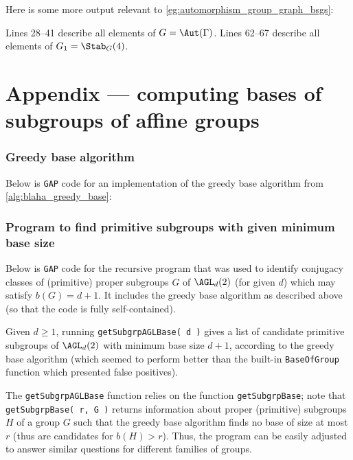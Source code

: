 Here is some more output relevant to \autoref{eg:automorphism_group_graph_bsgs}:\label{app:automorphism_group_graph_bsgs}



Lines 28--41 describe all elements of $G = \Aut(\Gamma)$. Lines 62--67 describe all elements of $G_1 = \Stab_G(4)$.

\chapter{Appendix --- computing bases of subgroups of affine groups}%

\subsection{Greedy base algorithm}

Below is \texttt{GAP} code for an implementation of the greedy base algorithm from \autoref{alg:blaha_greedy_base}:



\subsection{Program to find primitive subgroups with given minimum base size}

Below is \texttt{GAP} code for the recursive program that was used to identify conjugacy classes of (primitive) proper subgroups $G$ of $\AGL_d(2)$ (for given $d$) which may satisfy $b(G) = d + 1$. It includes the greedy base algorithm as described above (so that the code is fully self-contained).

Given $d \geq 1$, running \texttt{getSubgrpAGLBase( d )} gives a list of candidate primitive subgroups of $\AGL_d(2)$ with minimum base size $d + 1$, according to the greedy base algorithm (which seemed to perform better than the built-in \texttt{BaseOfGroup} function which presented false positives).

The \texttt{getSubgrpAGLBase} function relies on the function \texttt{getSubgrpBase}; note that \texttt{getSubgrpBase( r, G )} returns information about proper (primitive) subgroups $H$ of a group $G$ such that the greedy base algorithm finds no base of size at most $r$ (thus are candidates for $b(H) > r$). Thus, the program can be easily adjusted to answer similar questions for different families of groups.

